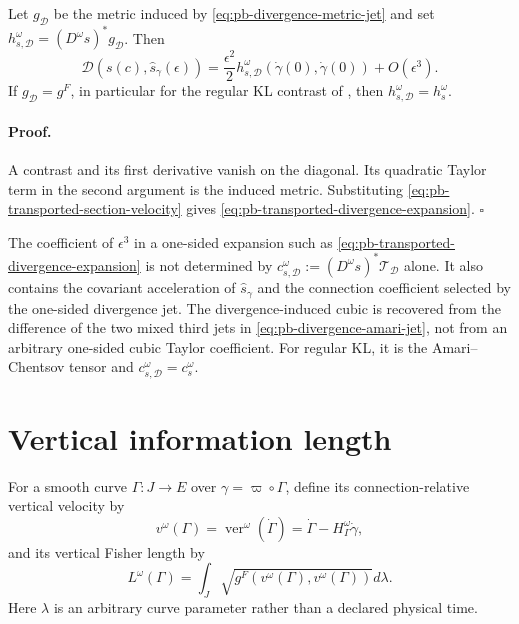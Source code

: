 Let $g_{\mathscr D}$ be the metric induced by
\eqref{eq:pb-divergence-metric-jet} and set
$h_{s,\mathscr D}^\omega=(D^\omega s)^*g_{\mathscr D}$.  Then
\begin{equation}
\mathscr D(s(c),\widehat s_\gamma(\epsilon))
=\frac{\epsilon^2}{2}h_{s,\mathscr D}^\omega
(\dot\gamma(0),\dot\gamma(0))
+O(\epsilon^3).
\label{eq:pb-transported-divergence-expansion}
\end{equation}
If $g_{\mathscr D}=g^F$, in particular for the regular KL contrast of
, then
$h_{s,\mathscr D}^\omega=h_s^\omega$.

\paragraph{Proof.}
A contrast and its first derivative vanish on the diagonal.  Its quadratic
Taylor term in the second argument is the induced metric.  Substituting
\eqref{eq:pb-transported-section-velocity} gives
\eqref{eq:pb-transported-divergence-expansion}.  $\square$

The coefficient of $\epsilon^3$ in a one-sided expansion such as
\eqref{eq:pb-transported-divergence-expansion} is not determined by
$c_{s,\mathscr D}^\omega:=(D^\omega s)^*\mathcal T_{\mathscr D}$ alone.
It also contains the covariant acceleration of
$\widehat s_\gamma$ and the connection coefficient selected by the one-sided
divergence jet.  The divergence-induced cubic is recovered from the
difference of the two mixed third jets in
\eqref{eq:pb-divergence-amari-jet}, not from an arbitrary one-sided cubic
Taylor coefficient.  For regular KL, it is the Amari--Chentsov tensor and
$c_{s,\mathscr D}^\omega=c_s^\omega$. 

\section{Vertical information length}
\label{sec:pb-curve-taxonomy}

For a smooth curve $\Gamma:J\to E$ over $\gamma=\varpi\circ\Gamma$, define its
connection-relative vertical velocity by
\begin{equation}
v^\omega(\Gamma)
=\operatorname{ver}^{\omega}(\dot\Gamma)
=\dot\Gamma-H^\omega_\Gamma\dot\gamma,
\label{eq:pb-curve-vertical-velocity}
\end{equation}
and its vertical Fisher length by
\begin{equation}
L^\omega(\Gamma)
=\int_J\sqrt{g^F(v^\omega(\Gamma),v^\omega(\Gamma))}d\lambda.
\label{eq:pb-vertical-fisher-length}
\end{equation}
Here $\lambda$ is an arbitrary curve parameter rather than a declared
physical time.  


